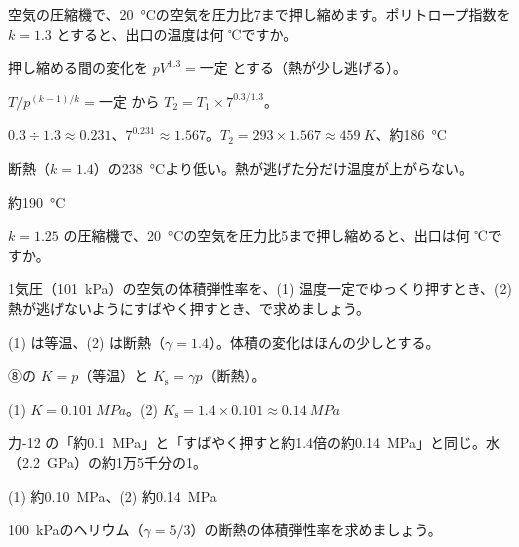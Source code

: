 \begin{reidai}[本当の圧縮機の出口の温度]
\label{ph:熱-3:ex12}空気の圧縮機で、\qty{20}{\celsius}の空気を圧力比7まで押し縮めます。ポリトロープ指数を $k=1.3$ とすると、出口の温度は何 ℃ですか。
\par{} 押し縮める間の変化を $pV^{1.3}=$一定 とする（熱が少し逃げる）。
\par\kangaekata $T/p^{(k-1)/k}=$一定 から $T_2=T_1\times7^{0.3/1.3}$。
\par\shiki $0.3\div1.3\approx0.231$、$7^{0.231}\approx1.567$。$T_2=293\times1.567\approx\qty{459}{K}$、約\qty{186}{\celsius}
\par{} 断熱（$k=1.4$）の\qty{238}{\celsius}より低い。熱が逃げた分だけ温度が上がらない。
\par\kotae 約\qty{190}{\celsius}
\end{reidai}
\begin{jibun}
$k=1.25$ の圧縮機で、\qty{20}{\celsius}の空気を圧力比5まで押し縮めると、出口は何 ℃ですか。
\end{jibun}

\begin{reidai}[空気の体積弾性率]
\label{ph:熱-3:ex13}1気圧（\qty{101}{kPa}）の空気の体積弾性率を、(1) 温度一定でゆっくり押すとき、(2) 熱が逃げないようにすばやく押すとき、で求めましょう。
\par{} (1) は等温、(2) は断熱（$\gamma=1.4$）。体積の変化はほんの少しとする。
\par\kangaekata ⑧の $K=p$（等温）と $K_{\mathrm s}=\gamma p$（断熱）。
\par\shiki (1) $K=\qty{0.101}{MPa}$。(2) $K_{\mathrm s}=1.4\times0.101\approx\qty{0.14}{MPa}$
\par{} 力-12 の「約\qty{0.1}{MPa}」と「すばやく押すと約1.4倍の約\qty{0.14}{MPa}」と同じ。水（\qty{2.2}{GPa}）の約1万5千分の1。
\par\kotae (1) 約\qty{0.10}{MPa}、(2) 約\qty{0.14}{MPa}
\end{reidai}
\begin{jibun}
\qty{100}{kPa}のヘリウム（$\gamma=5/3$）の断熱の体積弾性率を求めましょう。
\end{jibun}

